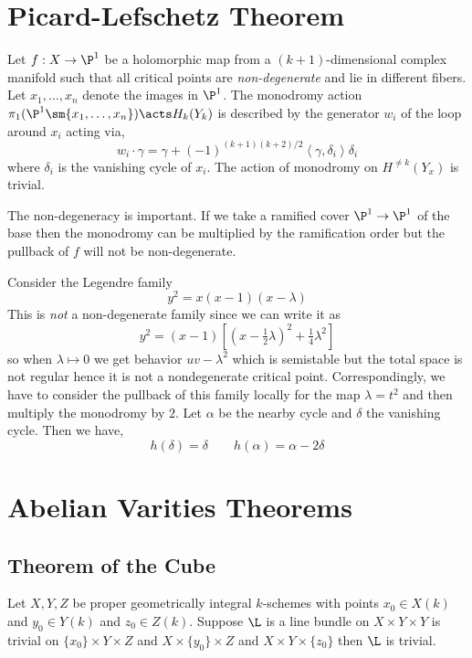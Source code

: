 \documentclass[12pt]{article}
\begin{document}
\section{Picard-Lefschetz Theorem}

\newcommand{\inner}[2]{\left< #1, #2 \right>}

\begin{theorem}
Let $f : X \to \P^1$ be a holomorphic map from a $(k+1)$-dimensional complex manifold such that all critical points are \textit{non-degenerate} and lie in different fibers. Let $x_1, \dots, x_n$ denote the images in $\P^1$. The monodromy action $\pi_1(\P^1 \sm \{ x_1, \dots, x_n \}) \acts H_k(Y_k)$ is described by the generator $w_i$ of the loop around $x_i$ acting via,
\[ w_i \cdot \gamma = \gamma + (-1)^{(k+1)(k+2)/2} \inner{\gamma}{\delta_i} \delta_i \]
where $\delta_i$ is the vanishing cycle of $x_i$. The action of monodromy on $H^{\neq k}(Y_x)$ is trivial.
\end{theorem}

The non-degeneracy is important. If we take a ramified cover $\P^1 \to \P^1$ of the base then the monodromy can be multiplied by the ramification order but the pullback of $f$ will not be non-degenerate.

\begin{example}
Consider the Legendre family
\[ y^2 = x (x - 1) (x - \lambda) \]
This is \textit{not} a non-degenerate family since we can write it as
\[ y^2 = (x - 1)[(x - \tfrac{1}{2} \lambda)^2 + \tfrac{1}{4} \lambda^2] \]
so when $\lambda \mapsto 0$ we get behavior $uv - \lambda^2$ which is semistable but the total space is not regular hence it is not a nondegenerate critical point. Correspondingly, we have to consider the pullback of this family locally for the map $\lambda = t^2$ and then multiply the monodromy by $2$. Let $\alpha$ be the nearby cycle and $\delta$ the vanishing cycle. Then we have,
\[ h(\delta) = \delta \quad \quad h(\alpha) = \alpha - 2 \delta \]
\end{example}

\section{Abelian Varities Theorems}

\subsection{Theorem of the Cube}

\begin{theorem}
Let $X,Y,Z$ be proper geometrically integral $k$-schemes with points $x_0 \in X(k)$ and $y_0 \in Y(k)$ and $z_0 \in Z(k)$. Suppose $\L$ is a line bundle on $X \times Y \times Y$ is trivial on $\{ x_0 \} \times Y \times Z$ and $X \times \{ y_0 \} \times Z$ and $X \times Y \times \{ z_0 \}$ then $\L$ is trivial.
\end{theorem}
\end{document}
